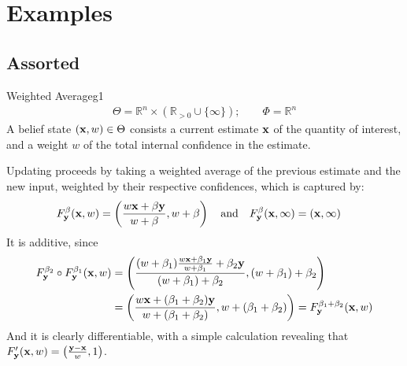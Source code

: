 \documentclass{article}
\begin{document}
\section{Examples}
\subsection{Assorted}

\begin{examplex}{Weighted Average}{g1}
    \begin{align*}
        \Theta = \mathbb R^n \times (\mathbb R_{> 0} \cup \{\infty\});
        \qquad
        \Phi = \mathbb R^n %
    \end{align*}
    A belief state $(\mathbf{x},w) \in \Theta$ consists a current estimate $\mathbf{x}$ of the quantity of interest, and a weight $w$ of the total internal confidence in the estimate.

    Updating proceeds by taking a weighted average of the previous estimate and the new input, weighted by their respective confidences, which is captured by:
    \begin{align*}
        F^\beta_{\mathbf{y}}(\mathbf{x}, w) &=  \left( \frac{ w \mathbf{x} + \beta \mathbf{y}}{w + \beta} , w + \beta \right)
        \quad\text{and}\quad
        F^{\beta}_{\mathbf{y}}(\mathbf{x}, \infty) = (\mathbf{x}, \infty)
    \end{align*}
    It is additive, since
    \begin{align*}
        F^{\beta_2}_{\mathbf{y}} \circ F^{\beta_1}_{\mathbf{y}}(\mathbf{x}, w)
        &= \left( \frac{ (w + \beta_1) \frac{ w \mathbf{x} + \beta_1 \mathbf{y}}{w + \beta_1} + \beta_2 \mathbf{y}}{(w + \beta_1) + \beta_2}, (w  + \beta_1) + \beta_2 \right) \\
        &= \left( \frac{  w \mathbf{x} + (\beta_1 + \beta_2) \mathbf{y}}{w + (\beta_1 + \beta_2)}, w  + (\beta_1 + \beta_2)\right)
        = F^{\beta_1 + \beta_2}_{\mathbf{y}}(\mathbf{x}, w)
    \end{align*}
    And it is clearly differentiable, with a simple calculation revealing that
    $ F'_{\mathbf{y}}(\mathbf{x}, w) = \left( \frac{\mathbf{y} - \mathbf{x}}{w}, 1\right) $.


\end{examplex}
\end{document}
